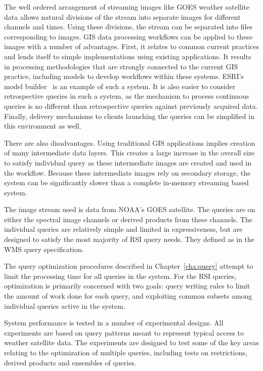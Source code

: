\documentclass{ucdthesis}       %
\begin{document}
The well ordered arrangement of streaming images like \ac{GOES}
weather satellite data allows natural divisions of the stream into
separate images for different channels and times.  Using these
divisions, the stream can be separated into files corresponding to
images.  \ac{GIS} data processing workflows can be applied to these
images with a number of advantages.  First, it relates to common current
practices and lends itself to simple implementations using existing
applications.  It results in processing methodologies that are
strongly connected to the current \ac{GIS} practice, including models
to develop workflows within these systems.  ESRI's model
builder~\cite{mccoy05arcgis-using} is an example of such a system.  It
is also easier to consider retrospective queries in such a system, as
the mechanism to process continuous queries is no different than
retrospective queries against previously acquired data.  Finally,
delivery mechanisms to clients launching the queries can be simplified
in this environment as well.

There are also disadvantages.  Using traditional \ac{GIS} applications
implies creation of many intermediate data layers.  This creates a
large increase in the overall size to satisfy individual query as
these intermediate images are created and used in the workflow.
Because these intermediate images rely on secondary storage, the
system can be significantly slower than a complete in-memory streaming
based system.  

The image stream used is data from \acs{NOAA}'s \ac{GOES} satellite.
The queries are on either the spectral image channels or derived
products from these channels.  The individual queries are relatively
simple and limited in expressiveness, but are designed to satisfy the
most majority of \ac{RSI} query needs.  They defined as in the
\ac{WMS} query specification.

The query optimization procedures described in Chapter~\ref{cha:query}
attempt to limit the processing time for all queries in the system.
For the \ac{RSI} queries, optimization is primarily concerned with two
goals: query writing rules to limit the amount of work done for each
query, and exploiting common subsets among individual queries active
in the system.

System performance is tested in a number of experimental designs.  All
experiments are based on query patterns meant to represent typical
access to weather satellite data.  The experiments are designed to
test some of the key areas relating to the optimization of multiple
queries, including tests on restrictions, derived products and ensembles
of queries.
\end{document}
